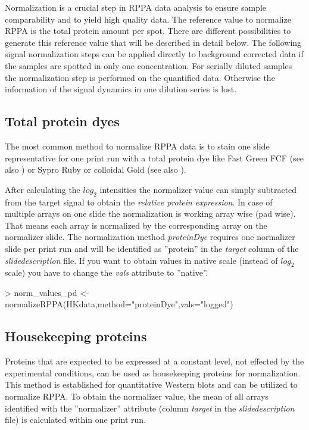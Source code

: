 \documentclass[12pt]{article}
\newcommand{\Rfunarg}[1]{{\textit{#1}}}
\begin{document}
Normalization is a crucial step in RPPA data analysis to ensure sample comparability and to yield 
high quality data. The reference value to normalize RPPA is the total protein amount per spot.
There are different possibilities to generate this reference value that will be described in detail below. 
The following signal normalization steps can be applied directly to background corrected data if the samples are spotted in only one concentration. For serially diluted samples the normalization step is performed on the quantified data. Otherwise the information of the signal dynamics in one dilution series is lost.

\subsection{Total protein dyes}

The most common method to normalize RPPA data is to stain one slide representative 
for one print run with a total protein dye like Fast Green FCF (see also \cite{Loebke:2007p612})
or Sypro Ruby or colloidal Gold (see also \cite{Spurrier:2008p934}). 

After calculating the $log_2$ intensities the normalizer value can simply subtracted from the target signal to obtain the \emph{relative protein expression}. In case of multiple arrays on one slide  the normalization is working array wise (pad wise). That means each array is normalized by the corresponding array on the normalizer slide. The normalization method \Rfunarg{proteinDye} requires one normalizer slide per print run and will be identified as ''protein'' in the \Rfunarg{target} column of the \emph{slidedescription} file. If you want to obtain values in native scale (instead of $log_2$ scale) you have to change the \Rfunarg{vals} attribute to ''native''.

\begin{Schunk}
\begin{Sinput}
> norm_values_pd <- normalizeRPPA(HKdata,method="proteinDye",vals="logged")
\end{Sinput}
\end{Schunk}

\subsection{Housekeeping proteins}
Proteins that are expected to be expressed at a constant level, not effected by the 
experimental conditions, can be used as housekeeping proteins for normalization. This
method is established for quantitative Western blots and can be utilized to normalize RPPA. 
To obtain the normalizer value, the mean of all arrays identified with the ''normalizer'' 
attribute (column \Rfunarg{target} in the \emph{slidedescription} file) is calculated within one print run. 
\end{document}
